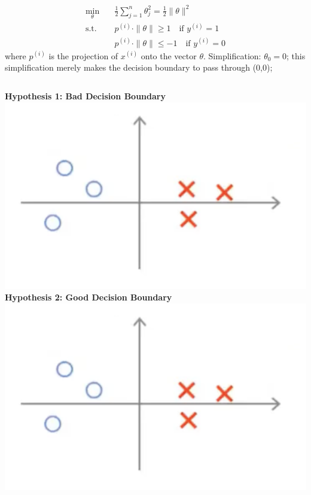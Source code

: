 \documentclass[9pt,dvipsnames]{beamer}
\begin{document}
\begin{frame}
\begin{align*}
	\min_{\theta} \quad & \frac{1}{2} \sum_{j=1}^{n} \theta_{j}^{2} =\frac{1}{2}\|\theta\|^{2} \\
	\text{s.t.} \quad & p^{(i)} \cdot \|\theta\| \geq 1 \quad \text{if } y^{(i)}=1 \\
	& p^{(i)} \cdot \|\theta\| \leq -1 \quad \text{if } y^{(i)}=0
\end{align*}
where \(p^{(i)}\) is the projection of \(x^{(i)}\) onto the vector \(\theta\).
Simplification: \(\theta_{0}=0\); this simplification merely makes the decision boundary to pass through (0,0);
\vspace{0.3cm}
\begin{columns}
	\textbf{Hypothesis 1: Bad Decision Boundary}
	\includegraphics[width = \textwidth]{imgs/svm_8.png}
	\textbf{Hypothesis 2: Good Decision Boundary}
	\includegraphics[width = \textwidth]{imgs/svm_8.png}
\end{columns}
\end{frame}
\end{document}
